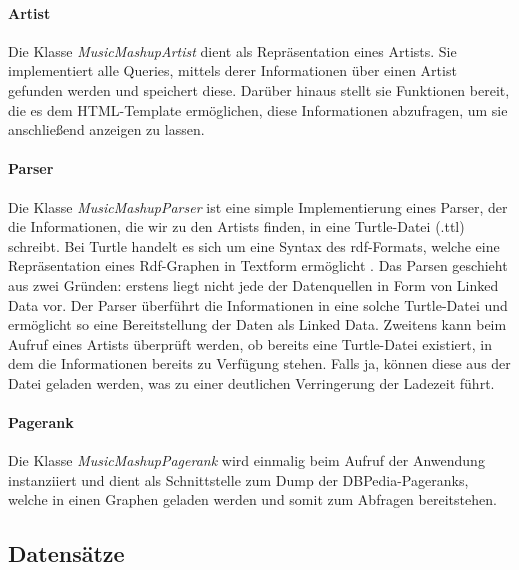 \paragraph{Artist} Die Klasse \textit{MusicMashupArtist} dient als Repräsentation eines Artists. Sie implementiert alle Queries, mittels derer Informationen über einen Artist gefunden werden und speichert diese. Darüber hinaus stellt sie Funktionen bereit, die es dem HTML-Template ermöglichen, diese Informationen abzufragen, um sie anschließend anzeigen zu lassen.


\paragraph{Parser} Die Klasse \textit{MusicMashupParser} ist eine simple Implementierung eines Parser, der die Informationen, die wir zu den Artists finden, in eine Turtle-Datei (.ttl) schreibt. Bei Turtle handelt es sich um eine Syntax des rdf-Formats, welche eine Repräsentation eines Rdf-Graphen in Textform ermöglicht \cite{turtle}. Das Parsen geschieht aus zwei Gründen: erstens liegt nicht jede der Datenquellen in Form von Linked Data vor. Der Parser überführt die Informationen in eine solche Turtle-Datei und ermöglicht so eine Bereitstellung der Daten als Linked Data.  Zweitens kann beim Aufruf eines Artists überprüft werden, ob bereits eine Turtle-Datei existiert, in dem die Informationen bereits zu Verfügung stehen. Falls ja, können diese aus der Datei geladen werden, was zu einer deutlichen Verringerung der Ladezeit führt.


\paragraph{Pagerank} Die Klasse \textit{MusicMashupPagerank} wird einmalig beim Aufruf der Anwendung instanziiert und dient als Schnittstelle zum Dump der DBPedia-Pageranks, welche in einen Graphen geladen werden und somit zum Abfragen bereitstehen.

\subsection{Datensätze}

